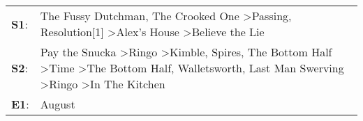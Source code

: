 \begin{supertabular}{p{0.03\textwidth}p{0.92\textwidth}}
 \textbf{S1}:  &                                                                                                                                                                                                                        The Fussy Dutchman\textsuperscript{}, \enspace The Crooked One\textsuperscript{} \textgreater \enspace Passing\textsuperscript{}, \enspace Resolution[1]\textsuperscript{} \textgreater \enspace Alex's House\textsuperscript{} \textgreater \enspace Believe the Lie\textsuperscript{}  \enspace  \\
 \textbf{S2}:  &  Pay the Snucka\textsuperscript{} \textgreater \enspace Ringo\textsuperscript{} \textgreater \enspace Kimble\textsuperscript{}, \enspace Spires\textsuperscript{}, \enspace The Bottom Half\textsuperscript{} \textgreater \enspace Time\textsuperscript{} \textgreater \enspace The Bottom Half\textsuperscript{}, \enspace Walletsworth\textsuperscript{}, \enspace Last Man Swerving\textsuperscript{} \textgreater \enspace Ringo\textsuperscript{} \textgreater \enspace In The Kitchen\textsuperscript{}  \enspace  \\
 \textbf{E1}:  &                                                                                                                                                                                                                                                                                                                                                                                                                                                                                       August\textsuperscript{}  \enspace  \\
\end{supertabular}
